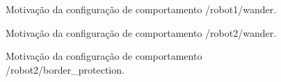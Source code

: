\datatable
\begin{figure}[htb]
    \centering
    
    \caption{Motivação da configuração de comportamento /robot1/wander.} \label{fig:motivacao1}
\end{figure}

\datatable
\begin{figure}[htb]
    \centering
    
    \caption{Motivação da configuração de comportamento /robot2/wander.} \label{fig:motivacao2}
\end{figure}

\datatable
\begin{figure}[htb]
    \centering
    
    \caption{Motivação da configuração de comportamento /robot2/border\_protection.} \label{fig:motivacao3}
\end{figure}